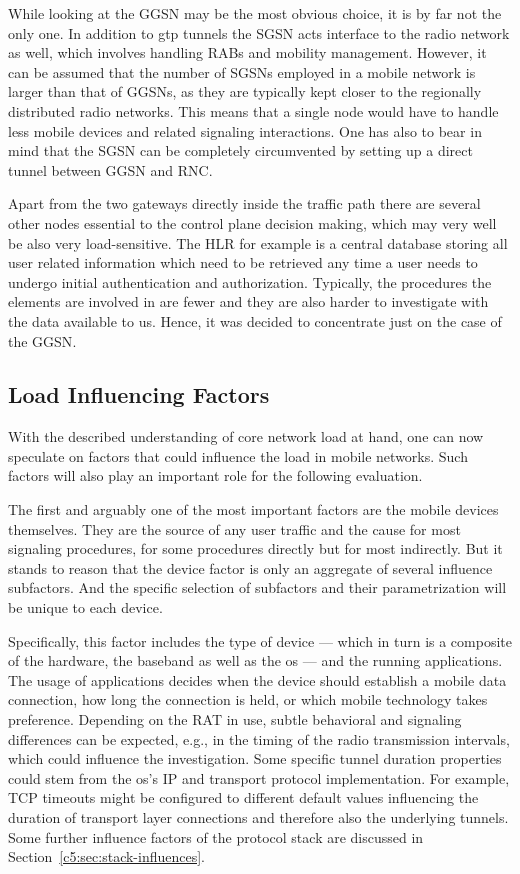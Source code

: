 While looking at the \gls{GGSN} may be the most obvious choice, it is by far not the only one. In addition to \gls{gtp} tunnels the \gls{SGSN} acts interface to the radio network as well, which involves handling \glspl{RAB} and mobility management. However, it can be assumed that the number of \glspl{SGSN} employed in a mobile network is larger than that of \glspl{GGSN}, as they are typically kept closer to the regionally distributed radio networks. This means that a single node would have to handle less mobile devices and related signaling interactions. One has also to bear in mind that the \gls{SGSN} can be completely circumvented by setting up a direct tunnel between \gls{GGSN} and \gls{RNC}.

Apart from the two gateways directly inside the traffic path there are several other nodes essential to the control plane decision making, which may very well be also very load-sensitive. The \gls{HLR} for example is a central database storing all user related information which need to be retrieved any time a user needs to undergo initial authentication and authorization. Typically, the procedures the elements are involved in are fewer and they are also harder to investigate with the data available to us. Hence, it was decided to concentrate just on the case of the \gls{GGSN}.


\subsection{Load Influencing Factors}

With the described understanding of core network load at hand, one can now speculate on factors that could influence the load in mobile networks. Such factors will also play an important role for the following evaluation.

The first and arguably one of the most important factors are the mobile devices themselves. They are the source of any user traffic and the cause for most signaling procedures, for some procedures directly but for most indirectly. But it stands to reason that the device factor is only an aggregate of several influence subfactors. And the specific selection of subfactors and their parametrization will be unique to each device.

Specifically, this factor includes the type of device --- which in turn is a composite of the hardware, the baseband as well as the \gls{os} --- and the running applications. The usage of applications decides when the device should establish a mobile data connection, how long the connection is held, or which mobile technology takes preference. Depending on the \gls{RAT} in use, subtle behavioral and signaling differences can be expected, e.g., in the timing of the radio transmission intervals, which could influence the investigation. Some specific tunnel duration properties could stem from the \gls{os}'s \gls{IP} and transport protocol implementation. For example, \gls{TCP} timeouts might be configured to different default values influencing the duration of transport layer connections and therefore also the underlying tunnels. Some further influence factors of the protocol stack are discussed in Section~\ref{c5:sec:stack-influences}.

